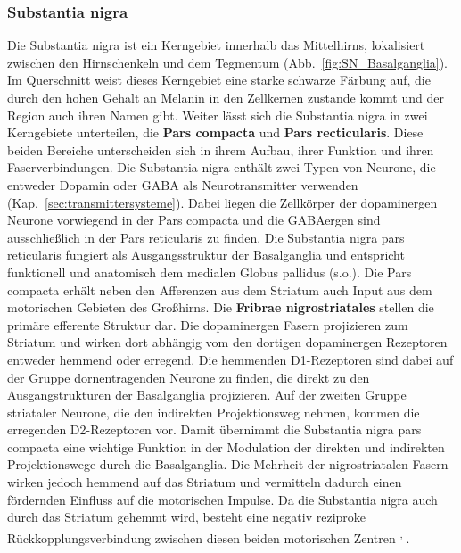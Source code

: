\documentclass[12pt,a4paper,pdftex]{article}
\begin{document}
\subsubsection*{Substantia nigra} 
Die Substantia nigra ist ein Kerngebiet innerhalb das Mittelhirns, lokalisiert zwischen den Hirnschenkeln und dem Tegmentum (Abb.~\ref{fig:SN_Basalganglia}). Im Querschnitt weist dieses Kerngebiet eine starke schwarze Färbung auf, die durch den hohen Gehalt an Melanin in den Zellkernen zustande kommt und der Region auch ihren Namen gibt. Weiter lässt sich die Substantia nigra in zwei Kerngebiete unterteilen, die \textbf{Pars compacta} und \textbf{Pars recticularis}. Diese beiden Bereiche unterscheiden sich in ihrem Aufbau, ihrer Funktion und ihren Faserverbindungen. Die Substantia nigra enthält zwei Typen von Neurone, die entweder Dopamin oder GABA als Neurotransmitter verwenden (Kap.~\ref{sec:transmittersysteme}). Dabei liegen die Zellkörper der dopaminergen Neurone vorwiegend in der Pars compacta und die GABAergen sind ausschließlich in der Pars reticularis zu finden. Die Substantia nigra pars reticularis fungiert als Ausgangsstruktur der Basalganglia und entspricht funktionell und anatomisch dem medialen Globus pallidus (s.o.). Die Pars compacta erhält neben den Afferenzen aus dem Striatum auch Input aus dem motorischen Gebieten des Großhirns. Die \textbf{Fribrae nigrostriatales}  stellen die primäre efferente Struktur dar. Die dopaminergen Fasern projizieren zum Striatum und wirken dort abhängig vom den dortigen dopaminergen Rezeptoren entweder hemmend oder erregend. Die hemmenden D1-Rezeptoren sind dabei auf der Gruppe dornentragenden Neurone zu finden, die direkt zu den Ausgangstrukturen der Basalganglia projizieren. Auf der zweiten Gruppe striataler Neurone, die den indirekten Projektionsweg nehmen, kommen die erregenden D2-Rezeptoren vor. Damit übernimmt die Substantia nigra pars compacta eine wichtige Funktion in der Modulation der direkten und indirekten Projektionswege durch die Basalganglia. Die Mehrheit der nigrostriatalen Fasern wirken jedoch hemmend auf das Striatum und vermitteln dadurch einen fördernden Einfluss auf die motorischen Impulse. Da die Substantia nigra auch durch das Striatum gehemmt wird, besteht eine negativ reziproke Rückkopplungsverbindung zwischen diesen beiden motorischen Zentren \textsuperscript{\cite[17]{paxinos2014rat}, \cite[9]{trepel2011neuroanatomie}}.
\end{document}
